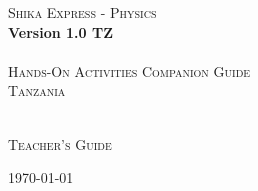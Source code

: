 \begin{titlepage}

\begin{center}
	\textsc{{\Huge Shika Express - Physics}}\\[0.4cm]
	\textbf{{\huge Version 1.0 TZ}}\\[1.5cm]
	\HRule\\[0.4cm]
	\textsc{{\Large Hands-On Activities Companion Guide}}\\[0.4cm]
	\textsc{{\Large Tanzania}}\\[0.4cm]
	\HRule\\[0.5cm]
\end{center}

\vfill
\begin{center}
\textsc{{\Large Teacher's Guide}}\\[0.4cm]
\end{center}

\begin{center}
	{\large \today}
\end{center}

\end{titlepage}
